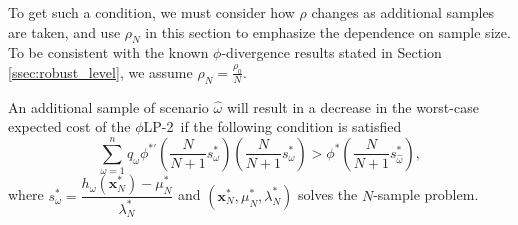 \documentclass[ijoc,letterpaper]{informs3} %
\newcommand{\x}{\mathbf{x}}
\newcommand{\plp}{$\phi$LP-2}
\begin{document}
To get such a condition, we must consider how $\rho$ changes as additional samples are taken, and use $\rho_N$ in this section to emphasize the dependence on sample size.
To be consistent with the known $\phi$-divergence results stated in Section \ref{ssec:robust_level}, we assume $\rho_N = \frac{\rho_0}{N}$.

\begin{proposition}
	\label{prop:value}
	An additional sample of scenario $\hat{\omega}$ will result in a decrease in the worst-case expected cost of the \plp\ if the following condition is satisfied
	\begin{equation} \label{eq:cost_decrease_cond}
		\sum_{\omega=1}^n q_\omega \phi^{*\prime}\left(\frac{N}{N+1}s^*_\omega\right) \left(\frac{N}{N+1}s^*_\omega\right) > \phi^*\left(\frac{N}{N+1}s^*_{\hat{\omega}}\right),
	\end{equation}
	where $s^*_\omega = \dfrac{h_\omega(\x^*_N) - \mu^*_N}{\lambda^*_N}$ and $(\x^*_N,\mu^*_N,\lambda^*_N)$ solves the $N$-sample problem.
\end{proposition}
\end{document}
